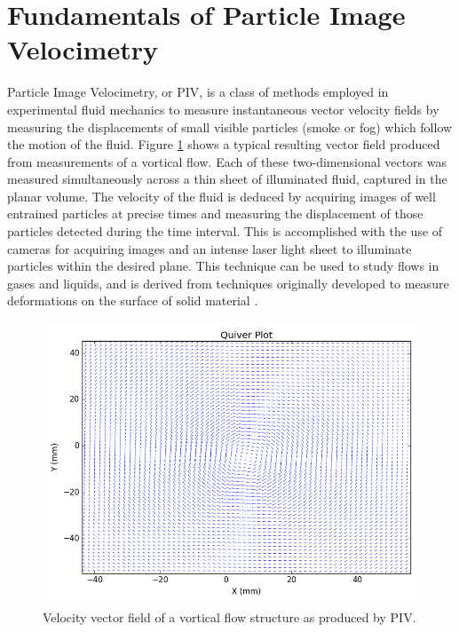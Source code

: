 \section{Fundamentals of Particle Image Velocimetry}

Particle Image Velocimetry, or PIV, is a class of methods employed in 
experimental fluid mechanics to measure instantaneous vector velocity fields by 
measuring the displacements of small visible particles (smoke or fog) which 
follow the motion of the fluid. Figure \ref{fig:quiver_example} shows a typical 
resulting vector field produced from measurements of a vortical flow. Each of 
these two-dimensional vectors was measured simultaneously across a thin sheet 
of illuminated fluid, captured in the planar volume. The velocity of the fluid 
is deduced by acquiring images of well entrained particles at precise times and 
measuring the displacement of those particles detected during the time 
interval. This is accomplished with the use of cameras for acquiring images 
and an intense laser light sheet to illuminate particles within the desired 
plane. This technique can be used to study flows in gases and liquids, and is 
derived from techniques originally developed to measure deformations on the 
surface of solid material \cite{arroyo1991,adrian1991}.

\begin{figure}[H]
	\centering
	\includegraphics[width=5in]{figs/example_vortex_figs/example_quiver}
	\caption{Velocity vector field of a vortical flow structure as produced by 
	PIV.}
	\label{fig:quiver_example}
\end{figure}

